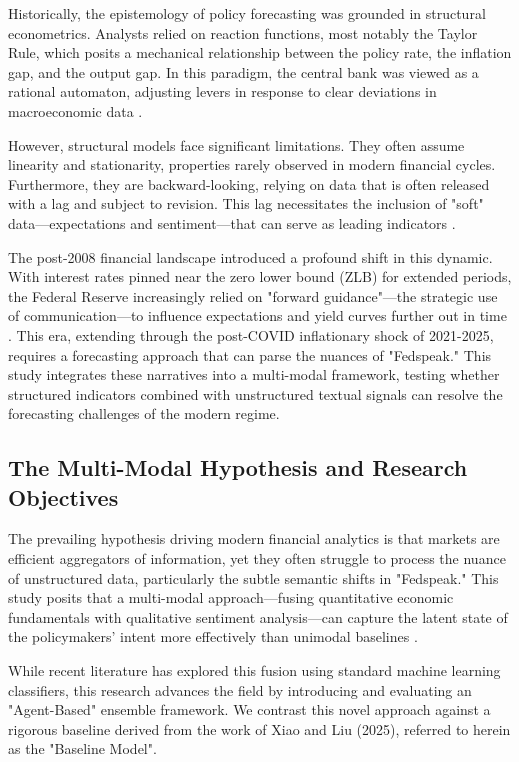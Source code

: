 \documentclass[11pt, a4paper]{article}
\begin{document}
Historically, the epistemology of policy forecasting was grounded in structural econometrics. Analysts relied on reaction functions, most notably the Taylor Rule, which posits a mechanical relationship between the policy rate, the inflation gap, and the output gap. In this paradigm, the central bank was viewed as a rational automaton, adjusting levers in response to clear deviations in macroeconomic data \cite{ref3}.

 However, structural models face significant limitations. They often assume linearity and stationarity, properties rarely observed in modern financial cycles. Furthermore, they are backward-looking, relying on data that is often released with a lag and subject to revision. This lag necessitates the inclusion of "soft" data—expectations and sentiment—that can serve as leading indicators \cite{ref6}.

The post-2008 financial landscape introduced a profound shift in this dynamic. With interest rates pinned near the zero lower bound (ZLB) for extended periods, the Federal Reserve increasingly relied on "forward guidance"—the strategic use of communication—to influence expectations and yield curves further out in time \cite{ref1}. This era, extending through the post-COVID inflationary shock of 2021-2025, requires a forecasting approach that can parse the nuances of "Fedspeak." This study integrates these narratives into a multi-modal framework, testing whether structured indicators combined with unstructured textual signals can resolve the forecasting challenges of the modern regime.

\subsection{The Multi-Modal Hypothesis and Research Objectives}
The prevailing hypothesis driving modern financial analytics is that markets are efficient aggregators of information, yet they often struggle to process the nuance of unstructured data, particularly the subtle semantic shifts in "Fedspeak." This study posits that a multi-modal approach—fusing quantitative economic fundamentals with qualitative sentiment analysis—can capture the latent state of the policymakers' intent more effectively than unimodal baselines \cite{ref4}.

While recent literature has explored this fusion using standard machine learning classifiers, this research advances the field by introducing and evaluating an "Agent-Based" ensemble framework. We contrast this novel approach against a rigorous baseline derived from the work of Xiao and Liu (2025), referred to herein as the "Baseline Model".
\end{document}
